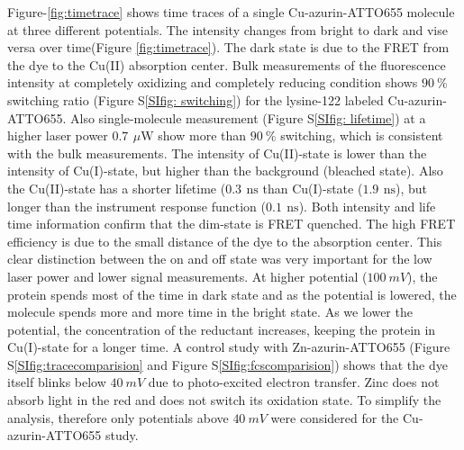 \documentclass[journal=jacsat,manuscript=article]{achemso}
\newcommand{\uW}{\ensuremath{\,\mu\textrm{W}}}
\newcommand{\ns}{\ensuremath{\,\textrm{ns}}}
\begin{document}
Figure-\ref{fig:timetrace} shows time traces of a single Cu-azurin-ATTO655 molecule at three different potentials. 
The intensity changes from bright to dark and vise versa over time(Figure \ref{fig:timetrace}). The dark state is 
due to the FRET from the dye to the Cu(II) absorption center\cite{kuznetsova2006a}. Bulk measurements of the 
fluorescence intensity at completely oxidizing and completely reducing condition shows $90~$\% switching 
ratio (Figure S\ref{SIfig: switching}) for the lysine-122 labeled Cu-azurin-ATTO655.\cite{nicolardi2012topdown} 
Also single-molecule measurement (Figure S\ref{SIfig: lifetime}) at a higher laser power $0.7~\uW$ show more than 
$90~\%$ switching, which is consistent with the bulk measurements. The intensity of Cu(II)-state is lower than the 
intensity of Cu(I)-state, but higher than the background (bleached state). Also the Cu(II)-state has a shorter 
lifetime ($0.3~\ns$ than Cu(I)-state ($1.9~\ns$), but longer than the instrument response function ($0.1~\ns$). 
Both intensity and life time information confirm that the dim-state is FRET quenched. The high FRET efficiency is due 
to the small distance of the dye to the absorption center. This clear distinction between the on and off state was 
very important for the low laser power and lower signal measurements. At higher potential ($100~mV$), the protein 
spends most of the time in dark state and as the potential is lowered, the molecule spends more and more time in the 
bright state. As we lower the potential, the concentration of the reductant increases, keeping the protein in 
Cu(I)-state for a longer time. A control study with Zn-azurin-ATTO655 (Figure S\ref{SIfig:tracecomparision} and 
Figure S\ref{SIfig:fcscomparision}) shows that the dye itself blinks below $40~mV$ due to photo-excited electron 
transfer. Zinc does not absorb light in the red and does not switch its oxidation state. To simplify the analysis, 
therefore only potentials above $40~mV$ were considered for the Cu-azurin-ATTO655 study.\\
\end{document}
